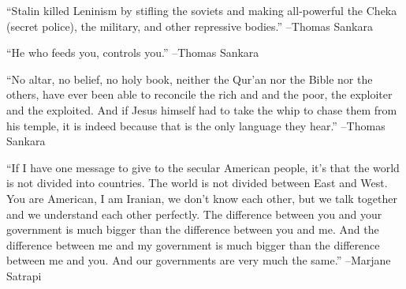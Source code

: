\documentclass{article}%
\begin{document}
\linebreak%
\vspace{1mm}%
\begin{minipage}{\textwidth}%
\flushleft%
“Stalin killed Leninism by stifling the soviets and making all{-}powerful the Cheka (secret police), the military, and other repressive bodies.”%
\linebreak%
\vspace{1mm}%
–Thomas Sankara%
\linebreak%
\vspace{1mm}%
\end{minipage}%
\linebreak%
\vspace{1mm}%
\begin{minipage}{\textwidth}%
\flushleft%
“He who feeds you, controls you.”%
\linebreak%
\vspace{1mm}%
–Thomas Sankara%
\linebreak%
\vspace{1mm}%
\end{minipage}%
\linebreak%
\vspace{1mm}%
\begin{minipage}{\textwidth}%
\flushleft%
“No altar, no belief, no holy book, neither the Qur’an nor the Bible nor the others, have ever been able to reconcile the rich and and the poor, the exploiter and the exploited. And if Jesus himself had to take the whip to chase them from his temple, it is indeed because that is the only language they hear.”%
\linebreak%
\vspace{1mm}%
–Thomas Sankara%
\linebreak%
\vspace{1mm}%
\end{minipage}%
\linebreak%
\vspace{1mm}%
\begin{minipage}{\textwidth}%
\flushleft%
“If I have one message to give to the secular American people, it's that the world is not divided into countries. The world is not divided between East and West. You are American, I am Iranian, we don't know each other, but we talk together and we understand each other perfectly. The difference between you and your government is much bigger than the difference between you and me. And the difference between me and my government is much bigger than the difference between me and you. And our governments are very much the same.”%
\linebreak%
\vspace{1mm}%
–Marjane Satrapi%
\linebreak%
\vspace{1mm}%
\end{minipage}%
\end{document}
